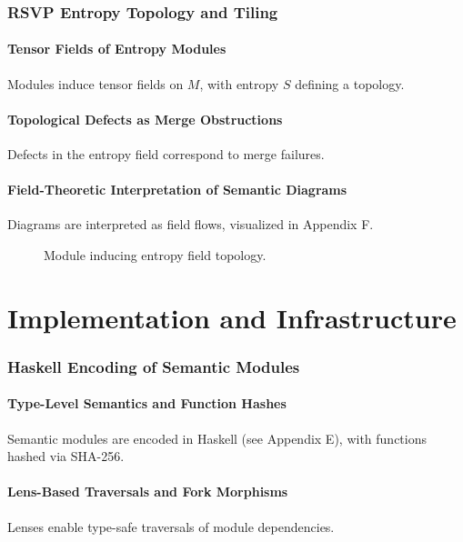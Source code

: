\documentclass[12pt]{article}
\begin{document}
\section{RSVP Entropy Topology and Tiling}
\subsection{Tensor Fields of Entropy Modules}
Modules induce tensor fields on $M$, with entropy $S$ defining a topology.

\subsection{Topological Defects as Merge Obstructions}
Defects in the entropy field correspond to merge failures.

\subsection{Field-Theoretic Interpretation of Semantic Diagrams}
Diagrams are interpreted as field flows, visualized in Appendix F.

\begin{figure}[h]
    \centering
    \caption{Module inducing entropy field topology.}
\end{figure}

\part{Implementation and Infrastructure}

\section{Haskell Encoding of Semantic Modules}
\subsection{Type-Level Semantics and Function Hashes}
Semantic modules are encoded in Haskell (see Appendix E), with functions hashed via SHA-256.

\subsection{Lens-Based Traversals and Fork Morphisms}
Lenses enable type-safe traversals of module dependencies.
\end{document}
